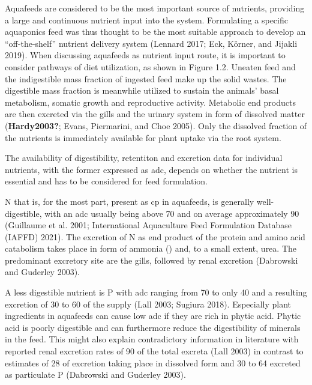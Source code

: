 \documentclass[preprint, 3p,
authoryear]{elsarticle} %
\begin{document}
Aquafeeds are considered to be the most important source of nutrients,
providing a large and continuous nutrient input into the system.
Formulating a specific aquaponics feed was thus thought to be the most
suitable approach to develop an ``off-the-shelf'' nutrient delivery
system (Lennard 2017; Eck, Körner, and Jijakli 2019). When discussing
aquafeeds as nutrient input route, it is important to consider pathways
of diet utilization, as shown in Figure 1.2. Uneaten feed and the
indigestible mass fraction of ingested feed make up the solid wastes.
The digestible mass fraction is meanwhile utilized to sustain the
animals' basal metabolism, somatic growth and reproductive activity.
Metabolic end products are then excreted via the gills and the urinary
system in form of dissolved matter (\textbf{Hardy2003?}; Evans,
Piermarini, and Choe 2005). Only the dissolved fraction of the nutrients
is immediately available for plant uptake via the root system.

The availability of digestibility, retentiton and excretion data for
individual nutrients, with the former expressed as \gls{adc}, depends on
whether the nutrient is essential and has to be considered for feed
formulation.

N that is, for the most part, present as \gls{cp} in aquafeeds, is
generally well-digestible, with an \gls{adc} usually being above
\SI{70}{\p} and on average approximately \SI{90}{\p} (Guillaume et al.
2001; International Aquaculture Feed Formulation Database (IAFFD) 2021).
The excretion of N as end product of the protein and amino acid
catabolism takes place in form of ammonia () and, to a small
extent, urea. The predominant excretory site are the gills, followed by
renal excretion (Dabrowski and Guderley 2003).

A less digestible nutrient is P with \gls{adc} ranging from \SI{70}{\p}
to only \SI{40}{\p} and a resulting excretion of \SI{30}{\p} to
\SI{60}{\p} of the supply (Lall 2003; Sugiura 2018). Especially plant
ingredients in aquafeeds can cause low \gls{adc} if they are rich in
phytic acid. Phytic acid is poorly digestible and can furthermore reduce
the digestibility of minerals in the feed. This might also explain
contradictory information in literature with reported renal excretion
rates of \SI{90}{\p} of the total excreta (Lall 2003) in contrast to
estimates of \SI{28}{\p} of excretion taking place in dissolved form and
\SI{30}{\p} to \SI{64}{\p} excreted as particulate P (Dabrowski and
Guderley 2003).
\end{document}

